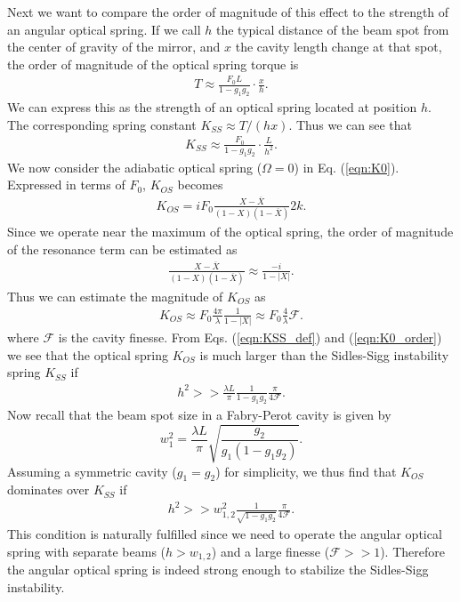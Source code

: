 Next we want to compare the order of magnitude of this effect to the strength of an angular optical spring. If we call $h$ the typical distance of the beam spot from the center of gravity of the mirror, and $x$ the cavity length change at that spot, the order of magnitude of the optical spring torque is
\begin{align}
T\approx \frac{F_0 L}{1-g_1g_2}\cdot \frac{x}{h}.
\end{align}
We can express this as the strength of an optical spring located at position $h$. The corresponding spring constant $K_{SS} \approx T/(h x)$. Thus we can see that
\begin{align}
\label{eqn:KSS_def}
K_{SS} \approx \frac{F_0}{1-g_1g_2}\cdot \frac{L}{h^2}.
\end{align}
We now consider the adiabatic optical spring ($\Omega=0$) in Eq. (\ref{eqn:K0}).  Expressed in terms of $F_0$, $K_{OS}$ becomes
\begin{align}
\label{eqn:KOS_exact}
K_{OS}=i F_0 \frac{X-\overline{X}}{(1-X)(1-\overline{X})}   2 k.
\end{align}
Since we operate near the maximum of the optical spring, the order of magnitude of the resonance term can be estimated as
\begin{align}
\label{eqn:res_est}
\frac{X-\overline{X}}{(1-X)(1-\overline{X})} \approx \frac{-i}{1-|X|}.
\end{align}
Thus we can estimate the magnitude of  $K_{OS}$ as
\begin{align}
\label{eqn:K0_order}
K_{OS} \approx F_0 \frac{4\pi}{\lambda}\frac{1}{1-|X|} \approx F_0 \frac{4}{\lambda} \mathcal{F}.
\end{align}
where $\mathcal{F}$ is the cavity finesse.
From Eqs. (\ref{eqn:KSS_def}) and (\ref{eqn:K0_order}) we see that the optical spring $K_{OS}$  is much larger than the Sidles-Sigg instability spring $K_{SS}$ if
\begin{align}
\label{eqn:h2}
h^2 >> \frac{\lambda L}{\pi} \frac{1}{1-g_1 g_2} \frac{\pi}{4 \mathcal{F}}.
\end{align}
Now recall that the beam spot size in a Fabry-Perot cavity is given by \cite{Siegman86}
\begin{equation}
w_1^2 = \frac{\lambda L}{\pi} \sqrt{\frac{g_2}{g_1(1-g_1 g_2)}}.
\label{equ:spotsize1}
\end{equation} 
Assuming a symmetric cavity ($g_1=g_2$) for simplicity, we thus find that $K_{OS}$  dominates over $K_{SS}$ if
\begin{align}
\label{eqn:h2w}
h^2 >> w_{1,2}^2 \frac{1}{\sqrt{1-g_1 g_2}} \frac{\pi}{4 \mathcal{F}}.
\end{align}
This condition is naturally fulfilled since we need to operate the angular optical spring with separate beams ($h>w_{1,2}$) and a large finesse ($\mathcal{F}>>1$). Therefore the angular optical spring is indeed strong enough to stabilize the Sidles-Sigg instability.


